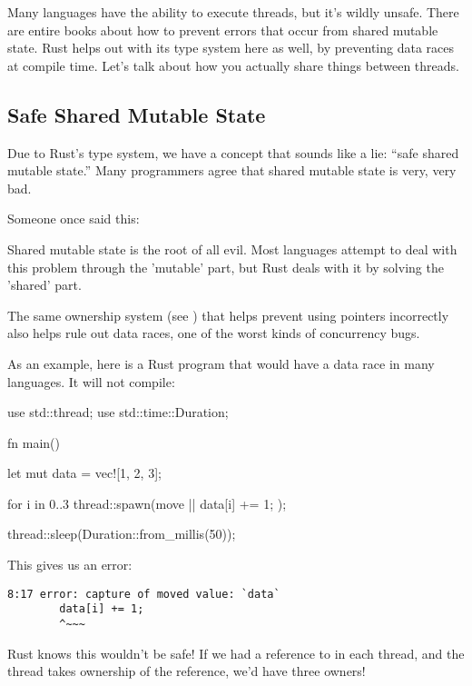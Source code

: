 Many languages have the ability to execute threads, but it's wildly unsafe. There are entire books about how to prevent errors that 
occur from shared mutable state. Rust helps out with its type system here as well, by preventing data races at compile time. Let's 
talk about how you actually share things between threads.

\subsection*{Safe Shared Mutable State}

Due to Rust's type system, we have a concept that sounds like a lie: \enquote{safe shared mutable state.} Many programmers agree 
that shared mutable state is very, very bad.

\blank

Someone once said this:

\begin{myquote}
Shared mutable state is the root of all evil. Most languages attempt to deal with this problem through the 'mutable' part, but 
Rust deals with it by solving the 'shared' part.
\end{myquote}

The same ownership system (see ) that helps prevent using pointers incorrectly also helps rule out 
data races, one of the worst kinds of concurrency bugs.

\blank

As an example, here is a Rust program that would have a data race in many languages. It will not compile:

\begin{rustc}
use std::thread;
use std::time::Duration;

fn main() {
    let mut data = vec![1, 2, 3];

    for i in 0..3 {
        thread::spawn(move || {
            data[i] += 1;
        });
    }

    thread::sleep(Duration::from_millis(50));
}
\end{rustc}

This gives us an error:

\begin{verbatim}
8:17 error: capture of moved value: `data`
        data[i] += 1;
        ^~~~
\end{verbatim}

Rust knows this wouldn't be safe! If we had a reference to  in each thread, and the thread takes ownership of the reference, 
we'd have three owners!

